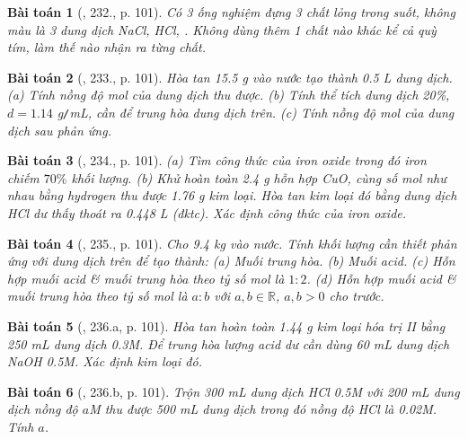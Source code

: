 \documentclass{article}
\newtheorem{baitoan}{Bài toán}
\begin{document}
\begin{baitoan}[\cite{Nguyen_Buu_Can_500_BT_Hoa_Hoc_THCS}, 232., p. 101]
	Có 3 ống nghiệm đựng 3 chất lỏng trong suốt, không màu là 3 dung dịch {\rm NaCl, HCl, }. Không dùng thêm 1 chất nào khác kể cả quỳ tím, làm thế nào nhận ra từng chất.
\end{baitoan}

\begin{baitoan}[\cite{Nguyen_Buu_Can_500_BT_Hoa_Hoc_THCS}, 233., p. 101]
	Hòa tan {\rm15.5 g } vào nước tạo thành {\rm0.5 L} dung dịch. (a) Tính nồng độ mol của dung dịch thu được. (b) Tính thể tích dung dịch {\rm{} 20\%}, $d = 1.14$ {\rm g{\tt/}mL}, cần để trung hòa dung dịch trên. (c) Tính nồng độ mol của dung dịch sau phản ứng.
\end{baitoan}

\begin{baitoan}[\cite{Nguyen_Buu_Can_500_BT_Hoa_Hoc_THCS}, 234., p. 101]
	(a) Tìm công thức của iron oxide trong đó iron chiếm $70\%$ khối lượng. (b) Khử hoàn toàn {\rm2.4 g} hỗn hợp {\rm CuO, } cùng số mol như nhau bằng hydrogen thu được {\rm1.76 g} kim loại. Hòa tan kim loại đó bằng dung dịch {\rm HCl} dư thấy thoát ra {\rm0.448 L } (đktc). Xác định công thức của iron oxide.
\end{baitoan}

\begin{baitoan}[\cite{Nguyen_Buu_Can_500_BT_Hoa_Hoc_THCS}, 235., p. 101]
	Cho {\rm9.4 kg } vào nước. Tính khối lượng {\rm{}} cần thiết phản ứng với dung dịch trên để tạo thành: (a) Muối trung hòa. (b) Muối acid. (c) Hỗn hợp muối acid \& muối trung hòa theo tỷ số mol là $1:2$. (d) Hỗn hợp muối acid \& muối trung hòa theo tỷ số mol là $a:b$ với $a,b\in\mathbb{R}$, $a,b > 0$ cho trước.
\end{baitoan}

\begin{baitoan}[\cite{Nguyen_Buu_Can_500_BT_Hoa_Hoc_THCS}, 236.a, p. 101]
	Hòa tan hoàn toàn {\rm1.44 g} kim loại hóa trị {\rm II} bằng {\rm250 mL} dung dịch {\rm{} 0.3M}. Để trung hòa lượng acid dư cần dùng {\rm60 mL} dung dịch {\rm NaOH 0.5M}. Xác định kim loại đó.
\end{baitoan}

\begin{baitoan}[\cite{Nguyen_Buu_Can_500_BT_Hoa_Hoc_THCS}, 236.b, p. 101]
	Trộn {\rm300 mL} dung dịch {\rm HCl 0.5M} với {\rm200 mL} dung dịch {\rm{}} nồng độ $a${\rm M} thu được {\rm500 mL} dung dịch trong đó nồng độ {\rm HCl} là {\rm0.02M}. Tính $a$.
\end{baitoan}
\end{document}
